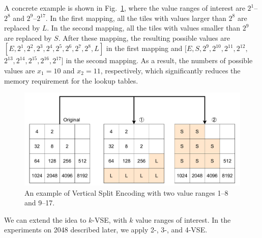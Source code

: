 A concrete example is shown in Fig.~\ref{fig:VSE-example}, where the value ranges of interest are $2^1$--$2^8$ and $2^9$--$2^{17}$.
In the first mapping, all the tiles with values larger than $2^{8}$ are replaced by $L$.
In the second mapping, all the tiles with values smaller than $2^{9}$ are replaced by $S$.
After these mapping, the resulting possible values are $[{E}, 2^1, 2^2, 2^3, 2^4, 2^5, 2^6, 2^7, 2^8, {L}]$ in the first mapping and $[{E}, {S}, 2^9, 2^{10}, 2^{11}, 2^{12}, $\break$2^{13}, 2^{14}, 2^{15}, 2^{16}, 2^{17}]$ in the second mapping.
As a result, the numbers of possible values are $x_1 = 10$ and $x_2 = 11$, respectively, which significantly reduces the memory requirement for the lookup tables.

\begin{figure}
 \includegraphics[width=.9\linewidth]{figures/VSE-example.pdf}
 \caption{An example of Vertical Split Encoding with two value ranges 1--8 and 9--17.}
 \label{fig:VSE-example}
\end{figure}


We can extend the idea to $k$-VSE, with $k$ value ranges of interest.
In the experiments on 2048 described later, we apply 2-, 3-, and 4-VSE.

